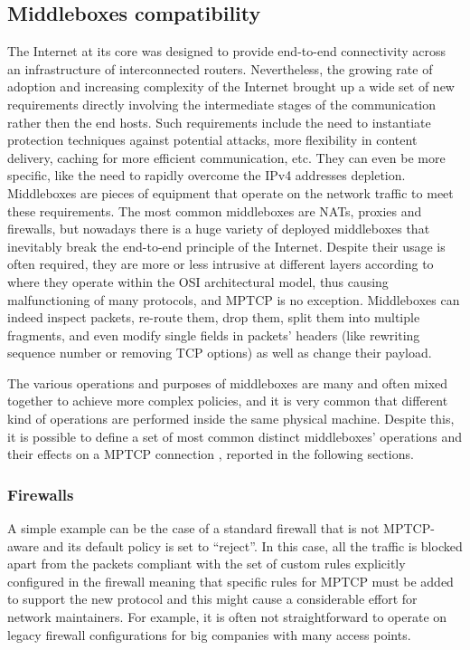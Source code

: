 \subsection{Middleboxes compatibility}
The Internet at its core was designed to provide end-to-end connectivity across an infrastructure of interconnected routers. Nevertheless, the growing rate of adoption and increasing complexity of the Internet brought up a wide set of new requirements directly involving the intermediate stages of the communication rather then the end hosts. Such requirements include the need to instantiate protection techniques against potential attacks, more flexibility in content delivery, caching for more efficient communication, etc. They can even be more specific, like the need to rapidly overcome the IPv4 addresses depletion. Middleboxes are pieces of equipment that operate on the network traffic to meet these requirements. The most common middleboxes are NATs, proxies and firewalls, but nowadays there is a huge variety of deployed middleboxes that inevitably break the end-to-end principle of the Internet. Despite their usage is often required, they are more or less intrusive at different layers according to where they operate within the OSI architectural model, thus causing malfunctioning of many protocols, and MPTCP is no exception. Middleboxes can indeed inspect packets, re-route them, drop them, split them into multiple fragments, and even modify single fields in packets' headers (like rewriting sequence number or removing TCP options) as well as change their payload.

The various operations and purposes of middleboxes are many and often mixed together to achieve more complex policies, and it is very common that different kind of operations are performed inside the same physical machine. Despite this, it is possible to define a set of most common distinct middleboxes' operations and their effects on a MPTCP connection  \cite{HDPDB13} \cite{RPBFHDBH12} \cite{2014:2578508}, reported in the following sections.

\subsubsection{Firewalls}
A simple example can be the case of a standard firewall that is not MPTCP-aware and its default policy is set to ``reject''. In this case, all the traffic is blocked apart from the packets compliant with the set of custom rules explicitly configured in the firewall meaning that specific rules for MPTCP must be added to support the new protocol and this might cause a considerable effort for network maintainers. For example, it is often not straightforward to operate on legacy firewall configurations for big companies with many access points.

